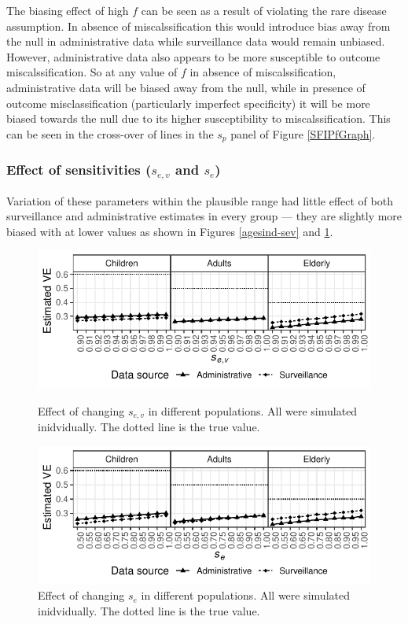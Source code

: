 \documentclass[11pt]{article}
\begin{document}
The biasing effect of high $f$ can be seen as a result of violating the rare disease assumption. In absence of miscalssification this would introduce bias away from the null in administrative data while surveillance data would remain unbiased. However, administrative data also appears to be more susceptible to outcome miscalssification. So at any value of $f$ in absence of miscalssification, administrative data will be biased away from the null, while in presence of outcome misclassification (particularly imperfect specificity) it will be more biased towards the null due to its higher susceptibility to miscalssification. This can be seen in the cross-over of lines in the $s_p$ panel of Figure \ref{SFIPfGraph}.

\pagebreak

\subsubsection{Effect of sensitivities ($s_{e,v}$ and $s_e$)}

Variation of these parameters within the plausible range had little effect of both surveillance and administrative estimates in every group --- they are slightly more biased with at lower values as shown in Figures \ref{agesind-sev} and \ref{agesind-spv}.

\begin{figure}[h]
	\centering
		\includegraphics[width=0.75\linewidth]{../fig-agesind/agesind-sens_vac.pdf}
		\caption{
Effect of changing $s_{e,v}$ in different populations. All were simulated inidvidually. The dotted line is the true value. \label{agesind-sev}
		}
		\includegraphics[width=0.75\linewidth]{../fig-agesind/agesind-sens_flu.pdf}
		\caption{
Effect of changing $s_e$ in different populations. All were simulated inidvidually. The dotted line is the true value. \label{agesind-spv}
		}
\end{figure}
\end{document}
